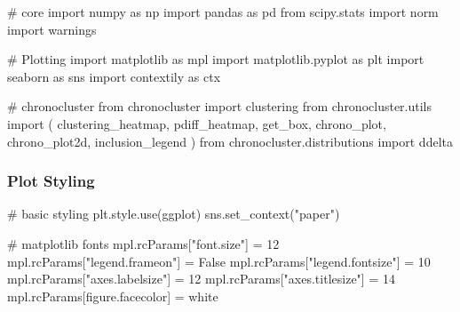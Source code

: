 \documentclass[
  11pt,
  letterpaper,
  DIV=11,
  numbers=noendperiod]{scrartcl}
\newenvironment{Shaded}{\begin{snugshade}}{\end{snugshade}}
\newcommand{\CommentTok}[1]{\textcolor[rgb]{0.37,0.37,0.37}{#1}}
\newcommand{\DecValTok}[1]{\textcolor[rgb]{0.68,0.00,0.00}{#1}}
\newcommand{\ImportTok}[1]{\textcolor[rgb]{0.00,0.46,0.62}{#1}}
\newcommand{\NormalTok}[1]{\textcolor[rgb]{0.00,0.23,0.31}{#1}}
\newcommand{\OperatorTok}[1]{\textcolor[rgb]{0.37,0.37,0.37}{#1}}
\newcommand{\StringTok}[1]{\textcolor[rgb]{0.13,0.47,0.30}{#1}}
\newcommand{\VariableTok}[1]{\textcolor[rgb]{0.07,0.07,0.07}{#1}}
\begin{document}
\begin{Shaded}
\begin{Highlighting}[]
\CommentTok{\# core}
\ImportTok{import}\NormalTok{ numpy }\ImportTok{as}\NormalTok{ np}
\ImportTok{import}\NormalTok{ pandas }\ImportTok{as}\NormalTok{ pd}
\ImportTok{from}\NormalTok{ scipy.stats }\ImportTok{import}\NormalTok{ norm}
\ImportTok{import}\NormalTok{ warnings}

\CommentTok{\# Plotting}
\ImportTok{import}\NormalTok{ matplotlib }\ImportTok{as}\NormalTok{ mpl}
\ImportTok{import}\NormalTok{ matplotlib.pyplot }\ImportTok{as}\NormalTok{ plt}
\ImportTok{import}\NormalTok{ seaborn }\ImportTok{as}\NormalTok{ sns}
\ImportTok{import}\NormalTok{ contextily }\ImportTok{as}\NormalTok{ ctx}

\CommentTok{\# chronocluster}
\ImportTok{from}\NormalTok{ chronocluster }\ImportTok{import}\NormalTok{ clustering}
\ImportTok{from}\NormalTok{ chronocluster.utils }\ImportTok{import}\NormalTok{ (}
\NormalTok{    clustering\_heatmap, }
\NormalTok{    pdiff\_heatmap, }
\NormalTok{    get\_box, }
\NormalTok{    chrono\_plot, }
\NormalTok{    chrono\_plot2d, }
\NormalTok{    inclusion\_legend}
\NormalTok{)}
\ImportTok{from}\NormalTok{ chronocluster.distributions }\ImportTok{import}\NormalTok{ ddelta}
\end{Highlighting}
\end{Shaded}

\subsubsection{Plot Styling}\label{plot-styling}

\begin{Shaded}
\begin{Highlighting}[]
\CommentTok{\# basic styling}
\NormalTok{plt.style.use(}\StringTok{\textquotesingle{}ggplot\textquotesingle{}}\NormalTok{)}
\NormalTok{sns.set\_context(}\StringTok{"paper"}\NormalTok{)}

\CommentTok{\# matplotlib fonts}
\NormalTok{mpl.rcParams[}\StringTok{"font.size"}\NormalTok{] }\OperatorTok{=} \DecValTok{12}
\NormalTok{mpl.rcParams[}\StringTok{"legend.frameon"}\NormalTok{] }\OperatorTok{=} \VariableTok{False}
\NormalTok{mpl.rcParams[}\StringTok{"legend.fontsize"}\NormalTok{] }\OperatorTok{=} \DecValTok{10}
\NormalTok{mpl.rcParams[}\StringTok{"axes.labelsize"}\NormalTok{] }\OperatorTok{=} \DecValTok{12}
\NormalTok{mpl.rcParams[}\StringTok{"axes.titlesize"}\NormalTok{] }\OperatorTok{=} \DecValTok{14}
\NormalTok{mpl.rcParams[}\StringTok{\textquotesingle{}figure.facecolor\textquotesingle{}}\NormalTok{] }\OperatorTok{=} \StringTok{\textquotesingle{}white\textquotesingle{}}
\end{Highlighting}
\end{Shaded}
\end{document}
